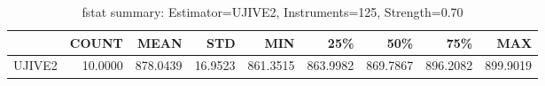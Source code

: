 \begin{table}[ht]
\centering
\caption{fstat summary: Estimator=UJIVE2, Instruments=125, Strength=0.70}
\begin{tabular}{lrrrrrrrr}
\toprule
 & COUNT & MEAN & STD & MIN & 25\% & 50\% & 75\% & MAX \\
\midrule
UJIVE2 & 10.0000 & 878.0439 & 16.9523 & 861.3515 & 863.9982 & 869.7867 & 896.2082 & 899.9019 \\
\bottomrule
\end{tabular}
\end{table}

